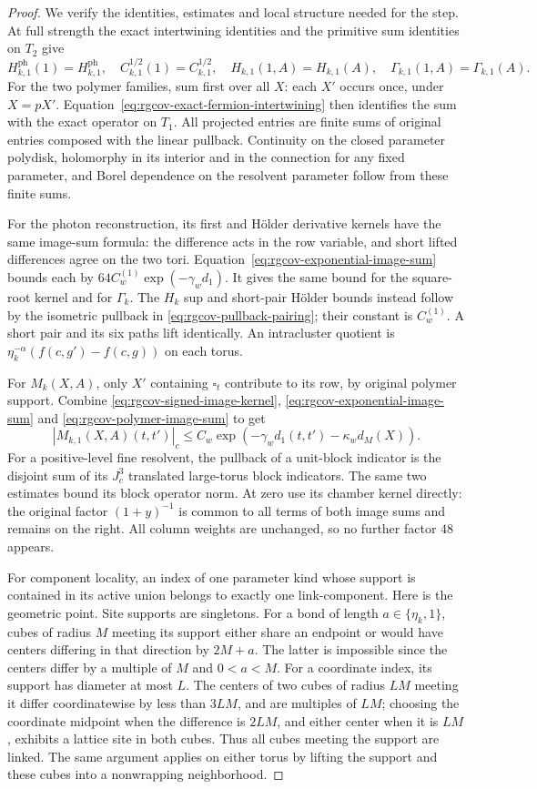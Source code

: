 \begin{proof}
We verify the identities, estimates and local structure
needed for the step.
At full strength the exact intertwining identities and
the primitive sum identities on $T_2$ give
\[
 H_{k,1}^{\mathrm{ph}}(1)=H_{k,1}^{\mathrm{ph}},\quad
 C_{k,1}^{1/2}(1)=C_{k,1}^{1/2},\quad
 H_{k,1}(1,A)=H_{k,1}(A),\quad
 \Gamma_{k,1}(1,A)=\Gamma_{k,1}(A).
\]
For the two polymer families, sum first over all $X$:
each $X'$ occurs once, under $X=pX'$.
Equation~\eqref{eq:rgcov-exact-fermion-intertwining}
then identifies the sum with the exact operator on $T_1$.
All projected entries are finite sums of original entries
composed with the linear pullback. Continuity on the
closed parameter polydisk, holomorphy in its interior and
in the connection for any fixed parameter, and Borel
dependence on the resolvent parameter follow from these
finite sums.

For the photon reconstruction, its first and H\"older
derivative kernels have the same image-sum formula:
the difference acts in the row variable, and short
lifted differences agree on the two tori.
Equation~\eqref{eq:rgcov-exponential-image-sum} bounds
each by $64C_w^{(1)}\exp(-\gamma_wd_1)$.
It gives the same bound for the square-root kernel
and for $\Gamma_k$.
The $H_k$ sup and short-pair H\"older bounds instead
follow by the isometric pullback in
\eqref{eq:rgcov-pullback-pairing}; their constant is
$C_w^{(1)}$. A short pair and its six paths lift
identically. An intracluster quotient is
$\eta_k^{-\alpha}(f(c,g')-f(c,g))$ on each torus.

For $M_k(X,A)$, only $X'$ containing $\square_t$
contribute to its row, by original polymer support.
Combine \eqref{eq:rgcov-signed-image-kernel},
\eqref{eq:rgcov-exponential-image-sum} and
\eqref{eq:rgcov-polymer-image-sum} to get
\[
 |M_{k,1}(X,A)(t,t')|_c
     \le C_w\exp(-\gamma_wd_1(t,t')-\kappa_wd_M(X)).
\]
For a positive-level fine resolvent, the pullback of
a unit-block indicator is the disjoint sum of its
$J_c^3$ translated large-torus block indicators.
The same two estimates bound its block operator
norm. At zero use its chamber kernel directly:
the original factor $(1+y)^{-1}$ is common to all
terms of both image sums and remains on the right.
All column weights are unchanged, so no further
factor $48$ appears.

For component locality, an index of one parameter kind
whose support is contained in its active union belongs
to exactly one link-component. Here is the geometric
point. Site supports are singletons. For a bond of
length $a\in\{\eta_k,1\}$, cubes of radius $M$ meeting
its support either share an endpoint or would have
centers differing in that direction by $2M+a$.
The latter is impossible since the centers differ by
a multiple of $M$ and $0<a<M$.
For a coordinate index, its support has diameter at
most $L$. The centers of two cubes of radius $LM$
meeting it differ coordinatewise by less than $3LM$,
and are multiples of $LM$; choosing the coordinate
midpoint when the difference is $2LM$, and either
center when it is $LM$, exhibits a lattice site in
both cubes. Thus all cubes meeting the support are
linked. The same argument applies on either torus
by lifting the support and these cubes into a
nonwrapping neighborhood.


\end{proof}
